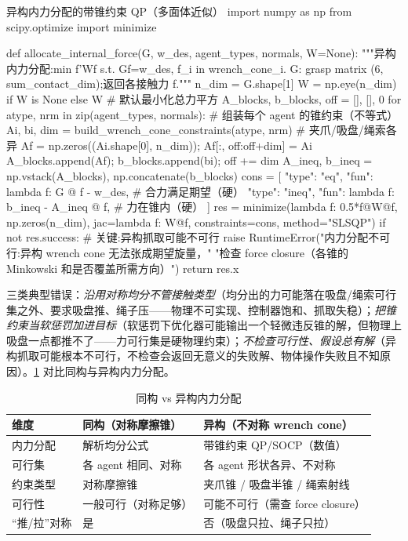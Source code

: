 \begin{codebox}[Python]{异构内力分配的带锥约束 QP（多面体近似）}
import numpy as np
from scipy.optimize import minimize

def allocate_internal_force(G, w_des, agent_types, normals, W=None):
    """异构内力分配:min f'Wf s.t. Gf=w_des, f_i in wrench_cone_i.
       G: grasp matrix (6, sum_contact_dim);返回各接触力 f."""
    n_dim = G.shape[1]
    W = np.eye(n_dim) if W is None else W            # 默认最小化总力平方
    A_blocks, b_blocks, off = [], [], 0
    for atype, nrm in zip(agent_types, normals):     # 组装每个 agent 的锥约束（不等式）
        Ai, bi, dim = build_wrench_cone_constraints(atype, nrm)  # 夹爪/吸盘/绳索各异
        Af = np.zeros((Ai.shape[0], n_dim)); Af[:, off:off+dim] = Ai
        A_blocks.append(Af); b_blocks.append(bi); off += dim
    A_ineq, b_ineq = np.vstack(A_blocks), np.concatenate(b_blocks)
    cons = [
        {"type": "eq",   "fun": lambda f: G @ f - w_des},        # 合力满足期望（硬）
        {"type": "ineq", "fun": lambda f: b_ineq - A_ineq @ f},  # 力在锥内（硬）
    ]
    res = minimize(lambda f: 0.5*f@W@f, np.zeros(n_dim), jac=lambda f: W@f,
                   constraints=cons, method="SLSQP")
    if not res.success:                              # 关键:异构抓取可能不可行
        raise RuntimeError("内力分配不可行:异构 wrench cone 无法张成期望旋量，"
                           "检查 force closure（各锥的 Minkowski 和是否覆盖所需方向）")
    return res.x
\end{codebox}

\noindent 三类典型错误：\emph{沿用对称均分不管接触类型}（均分出的力可能落在吸盘/绳索可行集之外、要求吸盘推、绳子压——物理不可实现、控制器饱和、抓取失稳）；\emph{把锥约束当软惩罚加进目标}（软惩罚下优化器可能输出一个轻微违反锥的解，但物理上吸盘一点都推不了——力可行集是硬物理约束）；\emph{不检查可行性、假设总有解}（异构抓取可能根本不可行，不检查会返回无意义的失败解、物体操作失败且不知原因）。\cref{tab:hmr-manip-compare} 对比同构与异构内力分配。

\begin{table}[H]\centering\small
\caption{同构 vs 异构内力分配}
\label{tab:hmr-manip-compare}
\begin{tabular}{lll}
\toprule
维度 & 同构（对称摩擦锥） & 异构（不对称 wrench cone） \\
\midrule
内力分配 & 解析均分公式 & 带锥约束 QP/SOCP（数值） \\
可行集 & 各 agent 相同、对称 & 各 agent 形状各异、不对称 \\
约束类型 & 对称摩擦锥 & 夹爪锥 / 吸盘半锥 / 绳索射线 \\
可行性 & 一般可行（对称足够） & 可能不可行（需查 force closure） \\
“推/拉”对称 & 是 & 否（吸盘只拉、绳子只拉） \\
\bottomrule
\end{tabular}
\end{table}

